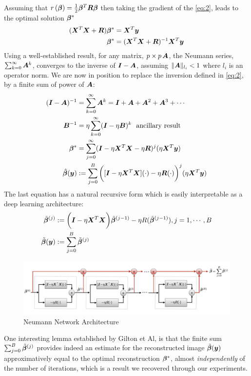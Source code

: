 \documentclass{article}
\begin{document}
Assuming that $r\left( \bm{\beta} \right) = \frac{1}{2} \bm{\beta}^T \bm{R} \bm{\beta}$ then taking the gradient of the \eqref{eq:2}, leads to the optimal solution $\bm{\beta}^{\ast}$
\begin{align*}
	(\bm{X}^T \bm{X} + \bm{R}) \bm{\beta}^* &=	\bm{X}^T \bm{y} \\
	\bm{\beta}^* 			&= (\bm{X}^T \bm{X} + \bm{R})^{-1} \bm{X}^T \bm{y} \\
\end{align*}
Using a well-established  result,  for any matrix, $ p \times p \, \bm{A}$, the Neumann series, $\sum_{k=0}^\infty \bm{A}^k$, converges to the inverse of $\bm{I} - \bm{A}$,
assuming $\|\bm{A}\|_{l_i} < 1$ where $l_i$ is an operator norm. We are now in position to replace the inversion defined in  \eqref{eq:2}, by a finite sum of power of $\bm{A}$:
\begin{align*}
	(\bm{I} - \bm{A})^{-1}	&= \sum_{k=0}^{\infty} \bm{A}^k = \bm{I} + \bm{A} + \bm{A}^2 + \bm{A}^3 + \cdots \\ 
	\bm{B}^{-1}			&= \eta  \sum_{k=0}^{\infty}  (\bm{I} - \eta \bm{B})^k \text{~ ancillary result} \\	
	\bm{\beta}^*			&=  \sum_{j=0}^{\infty} (\bm{I} - \eta \bm{X}^T \bm{X} -\eta \bm{R})^j (\eta \bm{X}^T \bm{y}) \\
	\hat{\bm{\beta}}(\bm{y})  &:=  \sum_{j=0}^{B} \bigg([ \bm{I} - \eta \bm{X}^T \bm{X} ](\cdot) -\eta \bm{R}(\cdot) \bigg)^j (\eta \bm{X}^T \bm{y}) \\	
\end{align*}
The last equation has a natural recursive form which is easily interpretable as a deep learning architecture:
\begin{align*}
	\tilde{\bm{\beta}}^{(j)} 		&:=	\bigg( \bm{I} - \eta \bm{X}^T \bm{X} \bigg) \tilde{\bm{\beta}}^{(j-1)} - \eta R(\tilde{\bm{\beta}}^{(j-1)}), j=1, \cdots , B \\
	\tilde{\bm{\beta}}(\bm{y})	&:=   \sum_{j=0}^{B} \tilde{\bm{\beta}}^{(j)} \\
\end{align*}
	\begin{figure}[H]
		\centering
		\captionsetup{justification=centering}
		\includegraphics[width=400pt]{nn_architecture}
		\caption{Neumann Network Architecture}
	\end{figure}
One interesting lemma established by Gilton et Al, is that the finite sum $\sum_{j=0}^{B} \tilde{\bm{\beta}}^{(j)} $ provides indeed an estimate for the reconstructed image $\tilde{\bm{\beta}}(\bm{y})$  approximatively equal to the optimal reconstruction  $\bm{\beta}^{\ast}$, almost \emph{independently} of the number of iterations, which is a result we recovered through our experiments.
\end{document}
